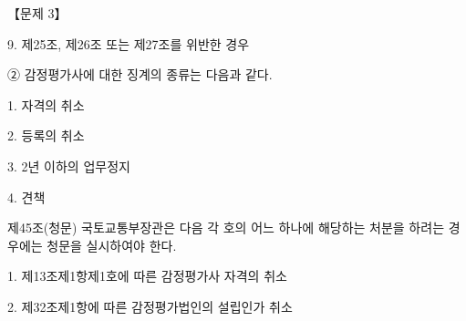 \begin{longquestion}{【문제 3】}
\begin{framedtext}
9. 제25조, 제26조 또는 제27조를 위반한 경우 \par
② 감정평가사에 대한 징계의 종류는 다음과 같다. \par
1. 자격의 취소 \par
2. 등록의 취소 \par
3. 2년 이하의 업무정지 \par
4. 견책 \par
제45조(청문) 국토교통부장관은 다음 각 호의 어느 하나에 해당하는 처분을 하려는 경우에는 청문을 실시하여야 한다. \par
1. 제13조제1항제1호에 따른 감정평가사 자격의 취소 \par
2. 제32조제1항에 따른 감정평가법인의 설립인가 취소 \par
\end{framedtext}
\end{longquestion}
